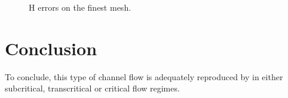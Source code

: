 \begin{figure}[H]
\centering
  \caption{H errors on the finest mesh.}
\label{fig:bumpcri:ErrNumH_convergence_mesh3}
\end{figure}


\section{Conclusion}

To conclude, this type of channel flow is adequately reproduced by
 in either subcritical, transcritical or critical flow regimes.



